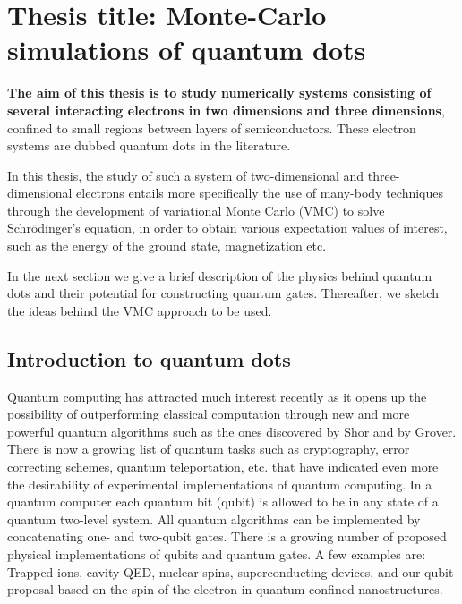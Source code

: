 \newcommand{\OP}[1]{{\bf\widehat{#1}}}

\newcommand{\be}{\begin{equation}}

\newcommand{\ee}{\end{equation}}



\pagestyle{plain}

\section*{Thesis title: Monte-Carlo simulations of quantum dots}

{\bf The aim of this thesis is to study numerically systems consisting of several
interacting electrons in two dimensions and three dimensions}, confined to small regions
between layers of semiconductors. 
These electron systems
are dubbed quantum dots in the literature. 

In this thesis,
the study of such a system of two-dimensional and three-dimensional electrons 
entails more specifically the use of many-body techniques through the 
development of variational Monte Carlo (VMC) to solve Schr\"odinger's equation, in order to obtain various expectation values of interest, such as the energy
of the ground state, magnetization etc. 

In the next section we give a 
brief description of the physics behind quantum dots and their
potential for constructing quantum gates. Thereafter, 
we sketch the ideas behind the VMC approach to be used.



\subsection*{Introduction to quantum dots}

Quantum computing has attracted much interest 
recently as it opens up the possibility of outperforming 
classical computation through new and more powerful quantum algorithms
such as the ones discovered by Shor and by Grover. 
There is now a growing list of quantum tasks 
such as cryptography, error correcting schemes, quantum
teleportation, etc. that have indicated even more the desirability 
of experimental implementations of quantum computing. 
In a quantum computer each quantum bit (qubit) is allowed
to be in any state of a quantum two-level system. 
All quantum algorithms can be implemented by 
concatenating one- and two-qubit gates. There is a growing number of proposed
physical implementations of qubits and quantum gates. 
A few examples are: Trapped ions, cavity QED, nuclear spins, 
superconducting devices, and
our qubit proposal 
based on the spin of the electron in quantum-confined nanostructures. 

